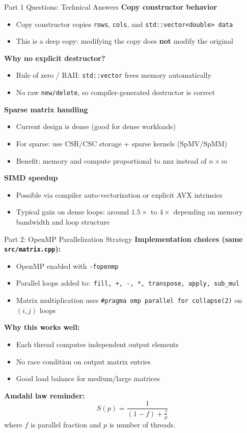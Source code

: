 \documentclass[aspectratio=169]{beamer}
\begin{document}
\begin{frame}{Part 1 Questions: Technical Answers}
\textbf{Copy constructor behavior}
\begin{itemize}
  \item Copy constructor copies \texttt{rows}, \texttt{cols}, and \texttt{std::vector<double> data}
  \item This is a deep copy: modifying the copy does \textbf{not} modify the original
\end{itemize}

\textbf{Why no explicit destructor?}
\begin{itemize}
  \item Rule of zero / RAII: \texttt{std::vector} frees memory automatically
  \item No raw \texttt{new/delete}, so compiler-generated destructor is correct
\end{itemize}

\textbf{Sparse matrix handling}
\begin{itemize}
  \item Current design is dense (good for dense workloads)
  \item For sparse: use CSR/CSC storage + sparse kernels (SpMV/SpMM)
  \item Benefit: memory and compute proportional to nnz instead of $n \times m$
\end{itemize}

\textbf{SIMD speedup}
\begin{itemize}
  \item Possible via compiler auto-vectorization or explicit AVX intrinsics
  \item Typical gain on dense loops: around $1.5\times$ to $4\times$ depending on memory bandwidth and loop structure
\end{itemize}
\end{frame}

\begin{frame}{Part 2: OpenMP Parallelization Strategy}
\textbf{Implementation choices (same \texttt{src/matrix.cpp}):}
\begin{itemize}
  \item OpenMP enabled with \texttt{-fopenmp}
  \item Parallel loops added to:\
  \texttt{fill, +, -, *, transpose, apply, sub\_mul}
  \item Matrix multiplication uses \texttt{\#pragma omp parallel for collapse(2)} on $(i,j)$ loops
\end{itemize}

\textbf{Why this works well:}
\begin{itemize}
  \item Each thread computes independent output elements
  \item No race condition on output matrix entries
  \item Good load balance for medium/large matrices
\end{itemize}

\textbf{Amdahl law reminder:}
\[
S(p)=\frac{1}{(1-f)+\frac{f}{p}}
\]
where $f$ is parallel fraction and $p$ is number of threads.
\end{frame}
\end{document}

